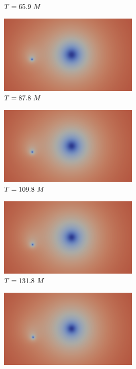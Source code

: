 \documentclass[landscape]{a0poster}
\begin{document}
\begin{textblock}{62}
\begin{textblock}{38}
\begin{figure}
\begin{subfigure}{0.0714\textwidth}
			\caption{\small ${T}=65.9~M$}
		\end{subfigure}
		\begin{subfigure}{0.0714\textwidth}
			\centering
			\includegraphics[height=1.5in]{figs/AE/r10/img_slice_000040.png}
			\caption{\small ${T}=87.8~M$}
		\end{subfigure}
		\begin{subfigure}{0.0714\textwidth}
			\centering
			\includegraphics[height=1.5in]{figs/AE/r10/img_slice_000050.png}
			\caption{\small ${T}=109.8~M$}
		\end{subfigure}
		\begin{subfigure}{0.0714\textwidth}
			\centering
			\includegraphics[height=1.5in]{figs/AE/r10/img_slice_000060.png}
			\caption{\small ${T}=131.8~M$}
		\end{subfigure}
		\begin{subfigure}{0.0714\textwidth}
			\centering
			\includegraphics[height=1.5in]{figs/AE/r10/img_slice_000070.png}

\end{subfigure}
\end{figure}
\end{textblock}
\end{textblock}
\end{document}
